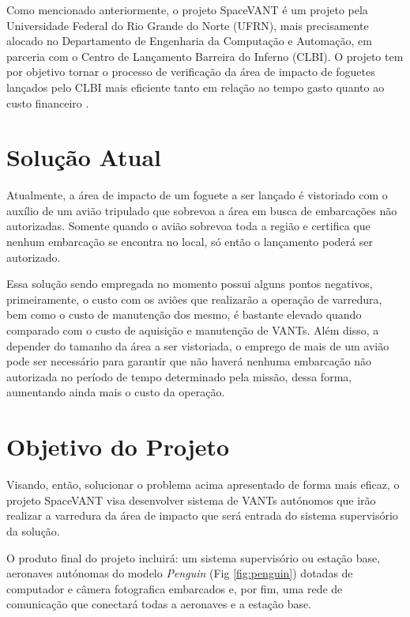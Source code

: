 \label{Cap:SpaceVANT}

Como mencionado anteriormente, o projeto SpaceVANT é um projeto pela Universidade Federal do Rio Grande do Norte (UFRN), mais precisamente alocado no Departamento de Engenharia da Computação e Automação, em parceria com o Centro de Lançamento Barreira do Inferno (CLBI). O projeto tem por objetivo tornar o processo de verificação da área de impacto de foguetes lançados pelo CLBI mais eficiente tanto em relação ao tempo gasto quanto ao custo financeiro \cite{everaerts2008use}.

\section{Solução Atual}

Atualmente, a área de impacto de um foguete a ser lançado é vistoriado com o auxílio de um avião tripulado que sobrevoa a área em busca de embarcações não autorizadas. Somente quando o avião sobrevoa toda a região e certifica que nenhum embarcação se encontra no local, só então o lançamento poderá ser autorizado.

Essa solução sendo empregada no momento possui alguns pontos negativos, primeiramente, o custo com os aviões que realizarão a operação de varredura, bem como o custo de manutenção dos mesmo, é bastante elevado quando comparado com o custo de aquisição e manutenção de VANTs. Além disso, a depender do tamanho da área a ser vistoriada, o emprego de mais de um avião pode ser necessário para garantir que não haverá nenhuma embarcação não autorizada no período de tempo determinado pela missão, dessa forma, aumentando ainda mais o custo da operação.

\section{Objetivo do Projeto}


Visando, então, solucionar o problema acima apresentado de forma mais eficaz, o projeto SpaceVANT visa desenvolver sistema de VANTs autónomos que irão realizar a varredura da área de impacto que será entrada do sistema supervisório da solução.

O produto final do projeto incluirá: um sistema supervisório ou estação base, aeronaves autónomas do modelo \emph{Penguin} (Fig \ref{fig:penguin}) dotadas de computador e câmera fotografica embarcados e, por fim, uma rede de comunicação que conectará todas a aeronaves e a estação base. 

